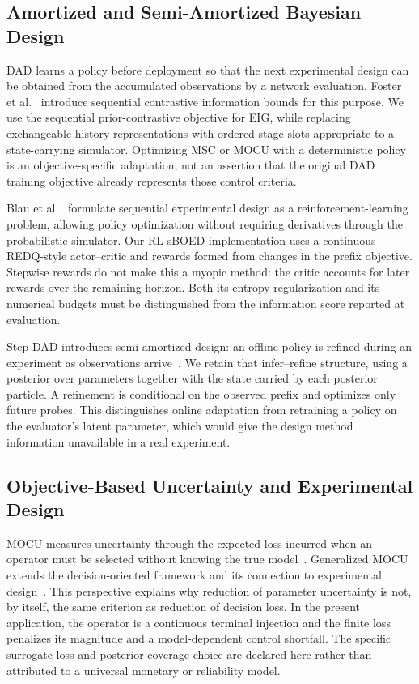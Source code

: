 \documentclass[journal]{IEEEtran}
\begin{document}
\subsection{Amortized and Semi-Amortized Bayesian Design}
DAD learns a policy before deployment so that the next experimental design can
be obtained from the accumulated observations by a network evaluation.
Foster et al.~\cite{foster2021dad} introduce sequential contrastive information
bounds for this purpose. We use the sequential prior-contrastive objective
for EIG, while replacing exchangeable history representations with ordered
stage slots appropriate to a state-carrying simulator. Optimizing MSC or MOCU
with a deterministic policy is an objective-specific adaptation, not an
assertion that the original DAD training objective already represents those
control criteria.

Blau et al.~\cite{blau2022rlsboed} formulate sequential experimental design as
a reinforcement-learning problem, allowing policy optimization without
requiring derivatives through the probabilistic simulator. Our RL-sBOED
implementation uses a continuous REDQ-style actor--critic and rewards formed
from changes in the prefix objective. Stepwise rewards do not make this a
myopic method: the critic accounts for later rewards over the remaining
horizon. Both its entropy regularization and its numerical budgets must be
distinguished from the information score reported at evaluation.

Step-DAD introduces semi-amortized design: an offline policy is refined during
an experiment as observations arrive~\cite{hedman2025stepdad}. We retain that
infer--refine structure, using a posterior over parameters together with the
state carried by each posterior particle. A refinement is conditional on the
observed prefix and optimizes only future probes. This distinguishes online
adaptation from retraining a policy on the evaluator's latent parameter, which
would give the design method information unavailable in a real experiment.

\subsection{Objective-Based Uncertainty and Experimental Design}
MOCU measures uncertainty through the expected loss incurred when an operator
must be selected without knowing the true model~\cite{yoon2013mocu}.
Generalized MOCU extends the decision-oriented framework and its connection
to experimental design~\cite{boluki2018generalized}. This perspective explains
why reduction of parameter uncertainty is not, by itself, the same criterion
as reduction of decision loss. In the present application, the operator is a
continuous terminal injection and the finite loss penalizes its magnitude
and a model-dependent control shortfall. The specific surrogate loss and
posterior-coverage choice are declared here rather than attributed to a
universal monetary or reliability model.
\end{document}
